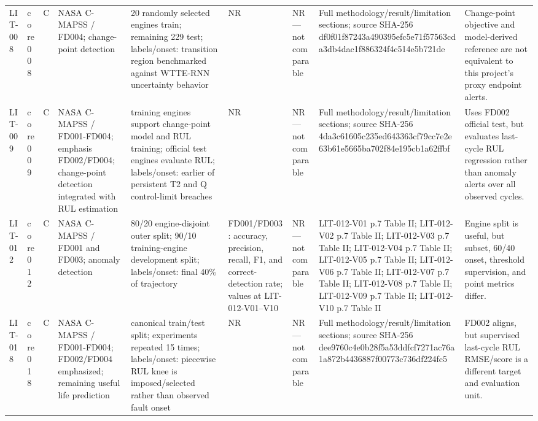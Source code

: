 \begin{table}[t]
\begin{tabular}{p{}p{}p{}p{}p{}p{}p{}p{}p{}}
LIT-008 & core008 & C & NASA C-MAPSS / FD004; change-point detection & 20 randomly selected engines train; remaining 229 test; labels/onset: transition region benchmarked against WTTE-RNN uncertainty behavior & NR & NR---not comparable & Full methodology/result/limitation sections; source SHA-256 df0f01f87243a490395efc5e71f57563cda3db4dac1f886324f4c514e5b721de & Change-point objective and model-derived reference are not equivalent to this project's proxy endpoint alerts. \\
LIT-009 & core009 & C & NASA C-MAPSS / FD001-FD004; emphasis FD002/FD004; change-point detection integrated with RUL estimation & training engines support change-point model and RUL training; official test engines evaluate RUL; labels/onset: earlier of persistent T2 and Q control-limit breaches & NR & NR---not comparable & Full methodology/result/limitation sections; source SHA-256 4da3c61605c235ed643363cf79cc7e2e63b61e5665ba702f84e195cb1a62ffbf & Uses FD002 official test, but evaluates last-cycle RUL regression rather than anomaly alerts over all observed cycles. \\
LIT-012 & core012 & C & NASA C-MAPSS / FD001 and FD003; anomaly detection & 80/20 engine-disjoint outer split; 90/10 training-engine development split; labels/onset: final 40\% of trajectory & FD001/FD003: accuracy, precision, recall, F1, and correct-detection rate; values at LIT-012-V01--V10 & NR---not comparable & LIT-012-V01 p.7 Table II; LIT-012-V02 p.7 Table II; LIT-012-V03 p.7 Table II; LIT-012-V04 p.7 Table II; LIT-012-V05 p.7 Table II; LIT-012-V06 p.7 Table II; LIT-012-V07 p.7 Table II; LIT-012-V08 p.7 Table II; LIT-012-V09 p.7 Table II; LIT-012-V10 p.7 Table II & Engine split is useful, but subset, 60/40 onset, threshold supervision, and point metrics differ. \\
LIT-018 & core018 & C & NASA C-MAPSS / FD001-FD004; FD002/FD004 emphasized; remaining useful life prediction & canonical train/test split; experiments repeated 15 times; labels/onset: piecewise RUL knee is imposed/selected rather than observed fault onset & NR & NR---not comparable & Full methodology/result/limitation sections; source SHA-256 dee9760c4e0b28f5a53ddfcf7271ac76a1a872b4436887f00773c736df224fc5 & FD002 aligns, but supervised last-cycle RUL RMSE/score is a different target and evaluation unit. \\

\end{tabular}
\end{table}
